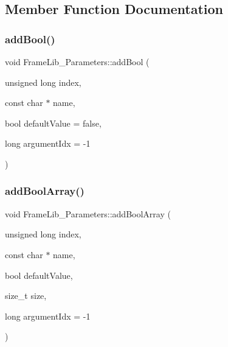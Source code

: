 \subsection{Member Function Documentation}
\mbox{\label{class_frame_lib___parameters_ad975cc435f4fa2006e1a722dad784d9a}} 
\subsubsection{\texorpdfstring{add\+Bool()}{addBool()}}
{\footnotesize\ttfamily void Frame\+Lib\+\_\+\+Parameters\+::add\+Bool (\begin{DoxyParamCaption}\item[{unsigned long}]{index,  }\item[{const char $\ast$}]{name,  }\item[{bool}]{default\+Value = {\ttfamily false},  }\item[{long}]{argument\+Idx = {\ttfamily -\/1} }\end{DoxyParamCaption})\hspace{0.3cm}{\ttfamily [inline]}}

\mbox{\label{class_frame_lib___parameters_a2f43754fb04e7601bc206961f9111b0d}} 
\subsubsection{\texorpdfstring{add\+Bool\+Array()}{addBoolArray()}}
{\footnotesize\ttfamily void Frame\+Lib\+\_\+\+Parameters\+::add\+Bool\+Array (\begin{DoxyParamCaption}\item[{unsigned long}]{index,  }\item[{const char $\ast$}]{name,  }\item[{bool}]{default\+Value,  }\item[{size\+\_\+t}]{size,  }\item[{long}]{argument\+Idx = {\ttfamily -\/1} }\end{DoxyParamCaption})\hspace{0.3cm}{\ttfamily [inline]}}

